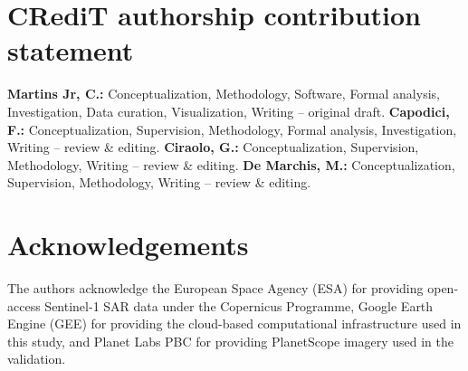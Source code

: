 \documentclass[review,12pt,authoryear]{elsarticle}
\begin{document}
\linenumbers   %








\section*{CRediT authorship contribution statement}
\textbf{Martins Jr, C.:} Conceptualization, Methodology, Software, Formal
analysis, Investigation, Data curation, Visualization, Writing -- original
draft. \textbf{Capodici, F.:} Conceptualization, Supervision, Methodology,
Formal analysis, Investigation, Writing -- review \& editing.
\textbf{Ciraolo, G.:} Conceptualization, Supervision, Methodology, Writing --
review \& editing. \textbf{De Marchis, M.:} Conceptualization, Supervision,
Methodology, Writing -- review \& editing.

\section*{Acknowledgements}
The authors acknowledge the European Space Agency (ESA) for providing open-access
Sentinel-1 SAR data under the Copernicus Programme, Google Earth Engine (GEE)
for providing the cloud-based computational infrastructure used in this study, and
Planet Labs PBC for providing PlanetScope imagery used in the validation.
\end{document}
